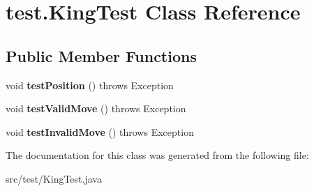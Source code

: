 \hypertarget{classtest_1_1_king_test}{}\section{test.\+King\+Test Class Reference}
\label{classtest_1_1_king_test}
\subsection*{Public Member Functions}
\begin{DoxyCompactItemize}
\item 
\mbox{\label{classtest_1_1_king_test_a74ddf32132becaa57b5e0a13fa0a8623}} 
void {\bfseries test\+Position} ()  throws Exception 
\item 
\mbox{\label{classtest_1_1_king_test_af74b3f848c5b36b3fbf5ce3c2de52759}} 
void {\bfseries test\+Valid\+Move} ()  throws Exception 
\item 
\mbox{\label{classtest_1_1_king_test_a201a47c7e35d8fa6582c6c91c62b6f03}} 
void {\bfseries test\+Invalid\+Move} ()  throws Exception 
\end{DoxyCompactItemize}


The documentation for this class was generated from the following file\+:\begin{DoxyCompactItemize}
\item 
src/test/King\+Test.\+java\end{DoxyCompactItemize}
